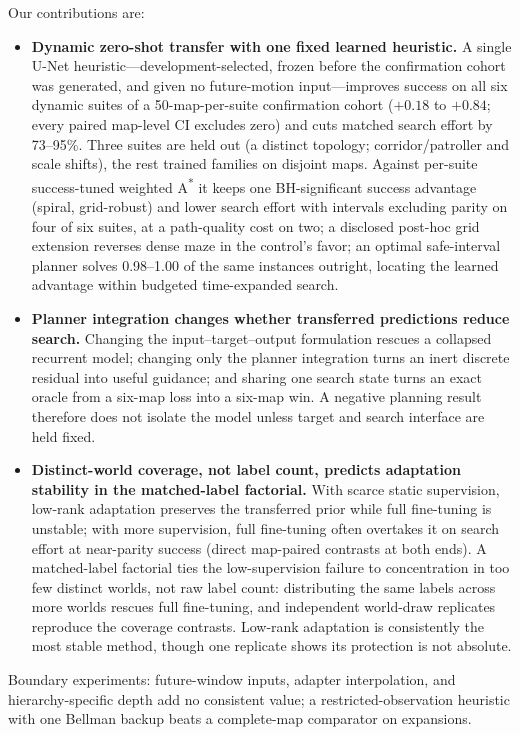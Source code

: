 \documentclass[letterpaper]{article} %
\begin{document}
Our contributions are:
\begin{itemize}
    \item \textbf{Dynamic zero-shot transfer with one fixed learned heuristic.} A single U-Net heuristic---development-selected, frozen before the confirmation cohort was generated, and given no future-motion input---improves success on all six dynamic suites of a 50-map-per-suite confirmation cohort ($+0.18$ to $+0.84$; every paired map-level CI excludes zero) and cuts matched search effort by 73--95\%. Three suites are held out (a distinct topology; corridor/patroller and scale shifts), the rest trained families on disjoint maps. Against per-suite success-tuned weighted A\textsuperscript{*} it keeps one BH-significant success advantage (spiral, grid-robust) and lower search effort with intervals excluding parity on four of six suites, at a path-quality cost on two; a disclosed post-hoc grid extension reverses dense maze in the control's favor; an optimal safe-interval planner solves 0.98--1.00 of the same instances outright, locating the learned advantage within budgeted time-expanded search.
    \item \textbf{Planner integration changes whether transferred predictions reduce search.} Changing the input--target--output formulation rescues a collapsed recurrent model; changing only the planner integration turns an inert discrete residual into useful guidance; and sharing one search state turns an exact oracle from a six-map loss into a six-map win. A negative planning result therefore does not isolate the model unless target and search interface are held fixed.
    \item \textbf{Distinct-world coverage, not label count, predicts adaptation stability in the matched-label factorial.} With scarce static supervision, low-rank adaptation preserves the transferred prior while full fine-tuning is unstable; with more supervision, full fine-tuning often overtakes it on search effort at near-parity success (direct map-paired contrasts at both ends). A matched-label factorial ties the low-supervision failure to concentration in too few distinct worlds, not raw label count: distributing the same labels across more worlds rescues full fine-tuning, and independent world-draw replicates reproduce the coverage contrasts. Low-rank adaptation is consistently the most stable method, though one replicate shows its protection is not absolute.
\end{itemize}
Boundary experiments: future-window inputs, adapter interpolation, and hierarchy-specific depth add no consistent value; a restricted-observation heuristic with one Bellman backup beats a complete-map comparator on expansions.
\end{document}
